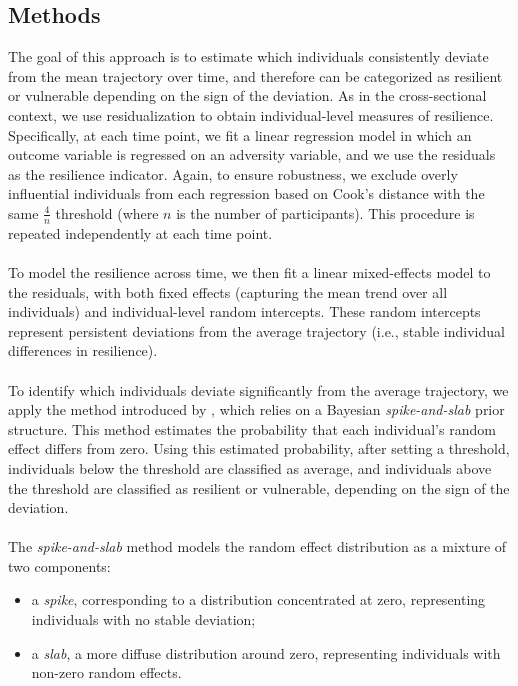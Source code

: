 \documentclass[12pt]{article}
\begin{document}
\subsection{Methods}
The goal of this approach is to estimate which individuals consistently deviate from the mean trajectory over time, and therefore can be categorized as resilient or vulnerable depending on the sign of the deviation. As in the cross-sectional context, we use residualization to obtain individual-level measures of resilience. Specifically, at each time point, we fit a linear regression model in which an outcome variable is regressed on an adversity variable, and we use the residuals as the resilience indicator. Again, to ensure robustness, we exclude overly influential individuals from each regression based on Cook’s distance with the same $\frac{4}{n}$ threshold (where $n$ is the number of participants). This procedure is repeated independently at each time point.\\
\\
To model the resilience across time, we then fit a linear mixed-effects model to the residuals, with both fixed effects (capturing the mean trend over all individuals) and individual-level random intercepts. These random intercepts represent persistent deviations from the average trajectory (i.e., stable individual differences in resilience).\\
\\
To identify which individuals deviate significantly from the average trajectory, we apply the method introduced by \cite{spike_and_slab}, which relies on a Bayesian \textit{spike-and-slab} prior structure. This method estimates the probability that each individual's random effect differs from zero. Using this estimated probability, after setting a threshold, individuals below the threshold are classified as average, and individuals above the threshold are classified as resilient or vulnerable, depending on the sign of the deviation.\\
\\
The \textit{spike-and-slab} method models the random effect distribution as a mixture of two components:
\begin{itemize}
  \item a \textit{spike}, corresponding to a distribution concentrated at zero, representing individuals with no stable deviation;
  \item a \textit{slab}, a more diffuse distribution around zero, representing individuals with non-zero random effects.
\end{itemize}
\end{document}
